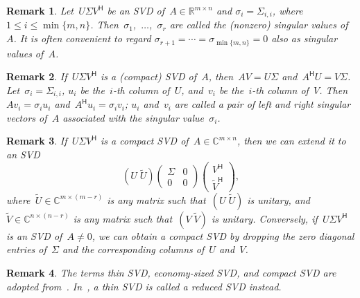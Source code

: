 \documentclass[11pt,a4paper]{article}  %
\numberwithin{equation}{section}
\newtheorem{remark}{Remark}%
\theoremstyle{definition}
\def\RR{\mathbb{R}}
\def\CC{\mathbb{C}}
\newcommand{\hmt}{{\scriptscriptstyle{{\mathsf{H}}}}}
\begin{document}
\begin{remark}
  Let~$U\Sigma V^\hmt$ be an SVD of~$A\in \RR^{m\times n}$ and $\sigma_i
  = \Sigma_{i,i}$, where $1\le i\le \min\{m,n\}$. Then~\mbox{$\sigma_1$, $\dots$, $\sigma_r$} are called the
  \textnormal{(}nonzero\textnormal{)} singular values of~$A$. It is often convenient to
  regard $\sigma_{r+1}=\cdots=\sigma_{\min\{m,n\}} = 0$ also as singular values of~$A$.
\end{remark}

\begin{remark}
If~$U\Sigma V^\hmt$ is a \textnormal{(}compact\textnormal{)} SVD
of~$A$, then~$AV = U\Sigma$ and~$A^\hmt U = V\Sigma$.
Let~$\sigma_i=\Sigma_{i,i}$, $u_i$ be the~$i$-th column of~$U$,
and~$v_i$ be the~$i$-th column of~$V$.
Then~$A v_i = \sigma_i u_i$ and~$A^\hmt u_i = \sigma_i v_i$; $u_i$ and~$v_i$
are called a pair of left and right singular vectors of~$A$ associated with the
singular value~$\sigma_{i}$.
\end{remark}

\begin{remark}
  If~$U \Sigma V^\hmt$ is a compact SVD of~$A \in \CC^{m\times n}$,
  then we can extend it to an SVD
  \begin{equation*}
    (U \; \tilde{U})
    \begin{pmatrix}
      \Sigma & 0\\
      0 & 0
    \end{pmatrix}
    \begin{pmatrix}
      V^\hmt\\
      \tilde{V}^\hmt
    \end{pmatrix},
  \end{equation*}
  where~$\tilde{U}\in \CC^{m\times(m-r)}$ is any matrix such that~$(U \; \tilde{U})$ is unitary,
  and~$\tilde{V} \in \CC^{n\times (n-r)}$ is any matrix such that~$(V \; \tilde{V})$ is unitary.
  Conversely, if~$U\Sigma V^\hmt$ is an SVD of~$A\neq 0$, we can obtain a compact
  SVD by dropping the zero diagonal entries of~$\Sigma$ and the
  corresponding columns of~$U$ and~$V$.
\end{remark}

\begin{remark}
    The terms \emph{thin} SVD, \emph{economy-sized} SVD, and \emph{compact} SVD are adopted
    from~\cite[Section~6.1]{Bai_etal_2000}.  In~\cite[Lecture~4]{Trefethen_Bau_1997}, a thin
    SVD is called a \emph{reduced} SVD instead.
\end{remark}
\end{document}
